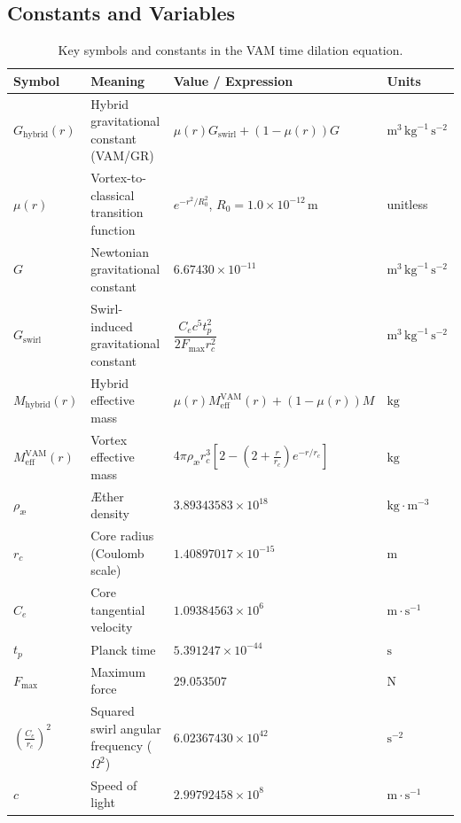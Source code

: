 \subsection{Constants and Variables}

\begin{table}[h]
      \centering
      \begin{tabular}{llll}
          \toprule
          \textbf{Symbol} & \textbf{Meaning} & \textbf{Value / Expression} & \textbf{Units} \\
          \midrule
        $G_{\text{hybrid}}(r)$ & Hybrid gravitational constant (VAM/GR) & $\mu(r) G_{\text{swirl}} + (1 - \mu(r)) G$ & $\text{m}^3\,\text{kg}^{-1}\,\text{s}^{-2}$ \\
        $\mu(r)$ & Vortex-to-classical transition function & $e^{-r^2 / R_0^2}$, $R_0 = 1.0 \times 10^{-12}\,\text{m}$ & unitless \\
        $G$ & Newtonian gravitational constant & $6.67430 \times 10^{-11}$ & $\text{m}^3\,\text{kg}^{-1}\,\text{s}^{-2}$ \\
        $G_{\text{swirl}}$ & Swirl-induced gravitational constant & $\dfrac{C_e c^5 t_p^2}{2 F_{\max} r_c^2}$ & $\text{m}^3\,\text{kg}^{-1}\,\text{s}^{-2}$ \\
        $M_{\text{hybrid}}(r)$ & Hybrid effective mass & $\mu(r) M_\text{eff}^\text{VAM}(r) + (1 - \mu(r)) M$ & $\text{kg}$ \\
        $M_\text{eff}^\text{VAM}(r)$ & Vortex effective mass & $4\pi \rho_\text{\ae} r_c^3 \left[ 2 - (2 + \frac{r}{r_c}) e^{-r/r_c} \right]$ & $\text{kg}$ \\
        $\rho_\text{\ae}$ & Æther density & $3.89343583 \times 10^{18}$ & $\text{kg}\cdot\text{m}^{-3}$ \\
        $r_c$ & Core radius (Coulomb scale) & $1.40897017 \times 10^{-15}$ & $\text{m}$ \\
        $C_e$ & Core tangential velocity & $1.09384563 \times 10^{6}$ & $\text{m}\cdot\text{s}^{-1}$ \\
        $t_p$ & Planck time & $5.391247 \times 10^{-44}$ & $\text{s}$ \\
        $F_{\max}$ & Maximum force & $29.053507$ & $\text{N}$ \\
        $\left(\frac{C_e}{r_c}\right)^2$ & Squared swirl angular frequency ($\Omega^2$) & $6.02367430 \times 10^{42}$ & $\text{s}^{-2}$ \\
        $c$ & Speed of light & $2.99792458 \times 10^8$ & $\text{m}\cdot\text{s}^{-1}$ \\
          \bottomrule
      \end{tabular}
    \caption{Key symbols and constants in the VAM time dilation equation.}
      \label{tab:time_dilation_symbols}
  \end{table}

